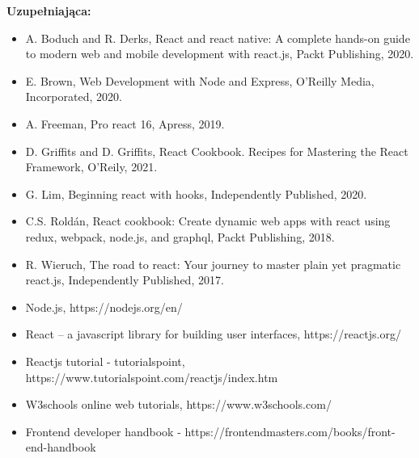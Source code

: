 \documentclass[12pt, a4paper]{article}
\begin{document}
\textbf{Uzupełniająca:}
\begin{itemize}
  \item A. Boduch and R. Derks, React and react native: A complete hands-on guide to modern web and mobile development with react.js, Packt Publishing, 2020.
  \item E. Brown, Web Development with Node and Express, O'Reilly Media, Incorporated, 2020.
  \item A. Freeman, Pro react 16, Apress, 2019.
  \item D. Griffits and D. Griffits, React Cookbook. Recipes for Mastering the React Framework, O'Reily, 2021.
  \item G. Lim, Beginning react with hooks, Independently Published, 2020.
  \item C.S. Roldán, React cookbook: Create dynamic web apps with react using redux, webpack, node.js, and graphql, Packt Publishing, 2018.
  \item R. Wieruch, The road to react: Your journey to master plain yet pragmatic react.js, Independently Published, 2017.
  \item Node.js, https://nodejs.org/en/
  \item React – a javascript library for building user interfaces, https://reactjs.org/
  \item Reactjs tutorial - tutorialspoint, https://www.tutorialspoint.com/reactjs/index.htm
  \item W3schools online web tutorials, https://www.w3schools.com/
  \item Frontend developer handbook - https://frontendmasters.com/books/front-end-handbook
\end{itemize}
\end{document}
